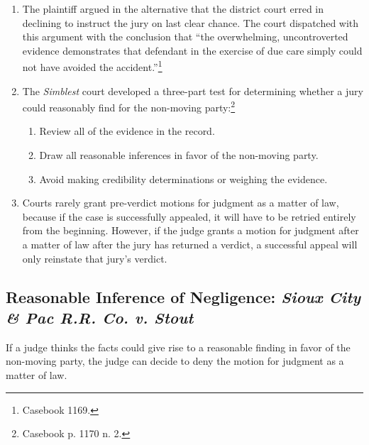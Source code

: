 \begin{enumerate}
    \item The plaintiff argued in the alternative that the district court 
    erred in declining to instruct the jury on last clear chance. The court 
    dispatched with this argument with the conclusion that ``the overwhelming, 
    uncontroverted evidence demonstrates that defendant in the exercise of due 
    care simply could not have avoided the accident.''\footnote{Casebook 
    1169.}
    \item The \emph{Simblest} court developed a three-part test for 
    determining whether a jury could reasonably find for the non-moving 
    party:\footnote{Casebook p. 1170 n. 2.}
    \begin{enumerate}
        \item Review all of the evidence in the record. 
        \item Draw all reasonable inferences in favor of the non-moving party.
        \item Avoid making credibility determinations or weighing the evidence.
    \end{enumerate}
    \item Courts rarely grant pre-verdict motions for judgment as a matter of 
    law, because if the case is successfully appealed, it will have to be 
    retried entirely from the beginning. However, if the judge grants a motion 
    for judgment after a matter of law after the jury has returned a verdict, 
    a successful appeal will only reinstate that jury's verdict.
\end{enumerate}

\subsection{Reasonable Inference of Negligence: \emph{Sioux City \& Pac R.R. 
Co. v. Stout}}

If a judge thinks the facts could give rise to a reasonable finding in favor 
of the non-moving party, the judge can decide to deny the motion for judgment 
as a matter of law.


